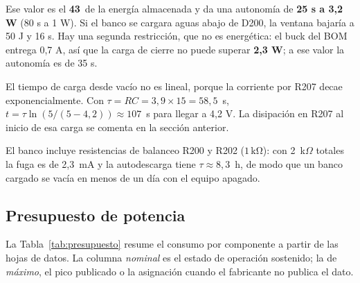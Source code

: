 \documentclass[11pt,a4paper]{article}
\newcommand{\pct}{\text{\char37}}
\begin{document}
Ese valor es el \textbf{43\,\pct} de la energía almacenada y da una autonomía de
\textbf{25 s a 3,2 W} (80 s a 1 W). Si el banco se cargara aguas abajo de D200,
la ventana bajaría a 50 J y 16 s. Hay una segunda restricción, que no es
energética: el buck del BOM entrega 0,7 A, así que la carga de cierre no puede
superar \textbf{2,3 W}; a ese valor la autonomía es de 35 s.

El tiempo de carga desde vacío no es lineal, porque la corriente por R207 decae
exponencialmente. Con $\tau = RC = 3{,}9 \times 15 = 58{,}5$~s,
$t = \tau \ln\!\left(5/(5-4{,}2)\right) \approx 107$~s para llegar a 4,2 V. La
disipación en R207 al inicio de esa carga se comenta en la sección anterior.

El banco incluye resistencias de balanceo R200 y R202
($1\,\mathrm{k\Omega}$): con 2~k$\Omega$ totales la fuga es de 2,3~mA y la
autodescarga tiene $\tau \approx 8{,}3$~h, de modo que un banco cargado se vacía
en menos de un día con el equipo apagado.

\subsection{Presupuesto de potencia}

La Tabla~\ref{tab:presupuesto} resume el consumo por componente a partir de las
hojas de datos. La columna \emph{nominal} es el estado de operación sostenido; la
de \emph{máximo}, el pico publicado o la asignación cuando el fabricante no
publica el dato.
\end{document}
